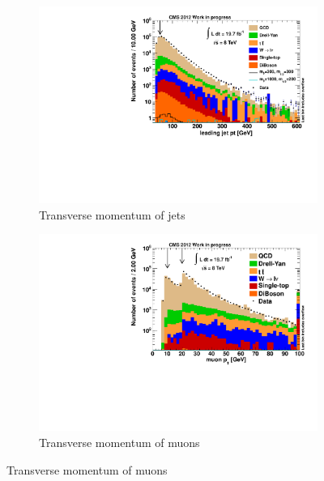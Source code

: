 \begin{figure}[!htbp]
  \ContinuedFloat
  \centering
  \begin{subfigure}[b]{0.495\textwidth}
    \centering
    \includegraphics[width=\textwidth]{plots/nTL_jetpt.pdf}
    \caption{Transverse momentum of jets\label{fig:ntljetpt}}
  \end{subfigure}
  \begin{subfigure}[b]{0.495\textwidth}
    \centering
    \includegraphics[width=\textwidth]{plots/nTL_mupt.pdf}
    \caption{Transverse momentum of muons \label{fig:ntlmupt}}
  \end{subfigure}
\end{figure}

